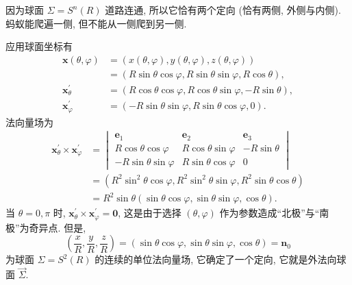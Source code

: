\begin{figure}[htbp]
\begin{minipage}[b]{0.48\linewidth}
    \caption{}\label{fig:11.2.9}
  \end{minipage}
\end{figure}

因为球面 $\Sigma=S^{n}(R)$ 道路连通, 所以它恰有两个定向 (恰有两侧, 外侧与内侧). 蚂蚁能爬遍一侧, 但不能从一侧爬到另一侧.

应用球面坐标有
\begin{align*}
  \boldsymbol{x}(\theta, \varphi) &=(x(\theta, \varphi), y(\theta, \varphi), z(\theta, \varphi)) \\
                                 &=(R \sin \theta \cos \varphi, R \sin \theta \sin \varphi, R \cos \theta), \\
  \boldsymbol{x}_{\theta}^{\prime} &=(R \cos \theta \cos \varphi, R \cos \theta \sin \varphi,-R \sin \theta), \\
  \boldsymbol{x}_{\varphi}^{\prime} &=(-R \sin \theta \sin \varphi, R \sin \theta \cos \varphi, 0).
\end{align*}
法向量场为
\begin{align*}
  \boldsymbol{x}_{\theta}^{\prime} \times \boldsymbol{x}_{\varphi}^{\prime}
  &=\begin{vmatrix}
      \boldsymbol{e}_{1} & \boldsymbol{e}_{2} & \boldsymbol{e}_{3} \\
      R \cos \theta \cos \varphi & R \cos \theta \sin \varphi & -R \sin \theta \\
      -R \sin \theta \sin \varphi & R \sin \theta \cos \varphi & 0
    \end{vmatrix} \\
  &=\left(R^{2} \sin ^{2} \theta \cos \varphi, R^{2} \sin ^{2} \theta \sin \varphi, R^{2} \sin \theta \cos \theta\right) \\
  &=R^{2} \sin \theta(\sin \theta \cos \varphi, \sin \theta \sin \varphi, \cos \theta).
\end{align*}
当 $\theta=0, \pi$ 时, $\boldsymbol{x}_{\theta}^{\prime} \times \boldsymbol{x}_{\varphi}^{\prime}=\boldsymbol{0}$, 这是由于选择 $(\theta, \varphi)$ 作为参数造成``北极''与``南极''为奇异点. 但是,
\[
  \left(\frac{x}{R}, \frac{y}{R}, \frac{z}{R}\right)=(\sin \theta \cos \varphi, \sin \theta \sin \varphi, \cos \theta)=\boldsymbol{n}_{0}
\]
为球面 $\Sigma=S^{2}(R)$ 的连续的单位法向量场, 它确定了一个定向, 它就是外法向球面 $\overrightarrow{\Sigma}$.

